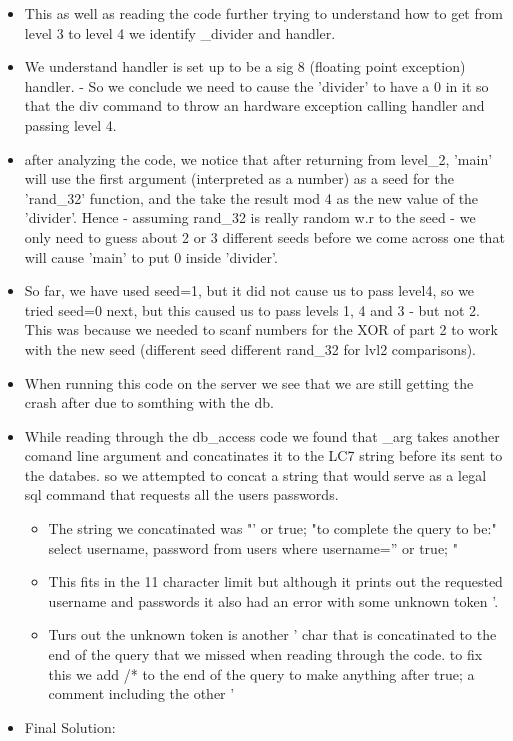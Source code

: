 \documentclass{article}
\begin{document}
\begin{itemize}
	
	\item This as well as reading the code further trying to understand how to get from level 3 to level 4 we identify \_divider and handler.
	\item We understand handler is set up to be a sig 8 (floating point exception) handler. 
		- So we conclude we need to cause the 'divider' to have a 0 in it so that the div command to throw an hardware exception calling handler and passing level 4.
	\item after analyzing the code, we notice that after returning from level\_2, 'main' will use the first argument (interpreted as a number) as a seed for
		the 'rand\_32' function, and the take the result mod 4 as the new value of the 'divider'. Hence - assuming rand\_32 is really random w.r to the seed - 
		we only need to guess about 2 or 3 different seeds before we come across one that will cause 'main' to put 0 inside 'divider'.
	\item So far, we have used seed=1, but it did not cause us to pass level4, so we tried seed=0 next, but this caused us to pass levels 1, 4 and 3 - but not 2.
		This was because we needed to scanf numbers for the XOR of part 2 to work with the new seed (different seed different rand\_32 for lvl2 comparisons).
	\item When running this code on the server we see that we are still getting the crash after due to somthing with the db.
	\item While reading through the db\_access code we found that \_arg takes another comand line argument and concatinates it to the LC7 string before its sent to the databes.
	so we attempted to concat a string that would serve as a legal sql command that requests all the users passwords.
	\begin{itemize}
	\item The string we concatinated was "' or true; "to complete the query to be:" select username, password from users where username='' or true; "
	\item This fits in the 11 character limit but although it prints out the requested username and passwords it also had an error with some unknown token '.
	\item Turs out the unknown token is another ' char that is concatinated to the end of the query that we missed when reading through the code. 
		to fix this we add /* to the end of the query to make anything after true; a comment including the other '
	\end{itemize}
	\item Final Solution:

\end{itemize}
\end{document}
